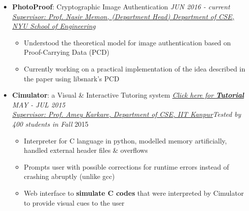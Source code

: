 \documentclass[letterpaper,11pt]{article}
\begin{document}
{\begin{itemize}
    \item \textbf{PhotoProof}: Cryptographic Image Authentication \hfill \textit{JUN 2016 - current}\\
    \href{http://engineering.nyu.edu/people/nasir-memon}{\textit{Supervisor: Prof. Nasir Memon, (Department Head) Department of CSE, NYU School of Engineering}}
    \vspace{-4pt}
    \begin{itemize}
        \item Understood the theoretical model for image authentication based on Proof-Carrying Data (PCD)
        \vspace{-2pt}
        \item Currently working on a practical implementation of the idea described in the paper using libsnark's PCD
        \vspace{-2pt}
    \end{itemize}
    \vspace{-5pt}
    \item \textbf{Cimulator}: a Visual \& Interactive Tutoring system\hspace{0.2in} \href{http://home.iitk.ac.in/~kunalkap/Cimulator.html}{\textit{Click here for \textbf{Tutorial}}} \hfill \textit{MAY - JUL 2015} \\
    \href{http://www.cse.iitk.ac.in/users/karkare/}{\textit{Supervisor: Prof. Amey Karkare, Department of CSE, IIT Kanpur}}\hfill \textit{Tested by 400 students in Fall} 2015\\
        \vspace{-4pt}
        \begin{itemize}
            \item Interpreter for C language in python, modelled memory artificially, handled external header files \& overflows
            \vspace{-2pt}
            \item Prompts user with possible corrections for runtime errors instead of crashing abruptly (unlike gcc)
            \vspace{-2pt}
            \item Web interface to \textbf{simulate C codes} that were interpreted by Cimulator to provide visual cues to the user
            \vspace{-2pt}
        \end{itemize}
\end{itemize}

}
\end{document}
